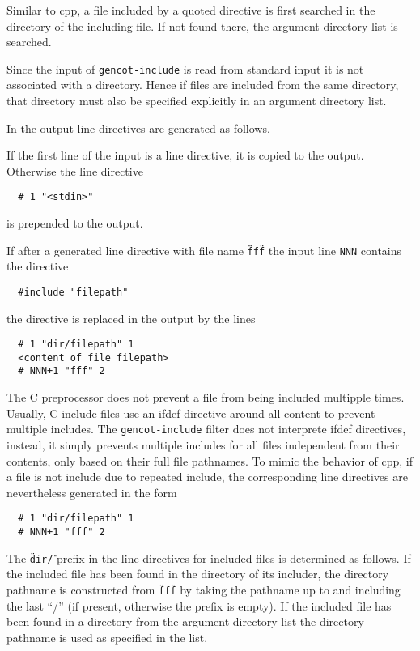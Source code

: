 \documentclass[a4paper]{report}
\newcommand{\code}[1]{\textnormal{\texttt{#1}}}
\begin{document}
Similar to cpp, a file included by a quoted directive is first searched in the directory of the including file. 
If not found there, the argument directory list is searched.

Since the input of \code{gencot-include} is read from standard input it is not associated with a directory. Hence
if files are included from the same directory, that directory must also be specified explicitly in an argument directory
list.

In the output line directives are generated as follows.

If the first line of the input is a line directive, it is copied to the output. Otherwise 
the line directive
\begin{verbatim}
  # 1 "<stdin>"
\end{verbatim}
is prepended to the output.

If after a generated line directive with file name \code{\"fff\"} the input line \code{NNN} contains the 
directive 
\begin{verbatim}
  #include "filepath"
\end{verbatim}
the directive is replaced in the output by the lines 
\begin{verbatim}
  # 1 "dir/filepath" 1
  <content of file filepath>
  # NNN+1 "fff" 2
\end{verbatim}

The C preprocessor does not prevent a file from being included multipple times. Usually, C include files use
an ifdef directive around all content to prevent multiple includes. The \code{gencot-include} filter does
not interprete ifdef directives, instead, it simply prevents multiple includes for all files independent 
from their contents, only based on their full file pathnames. To mimic the behavior of cpp, if a file is 
not include due to repeated include, the corresponding line directives are nevertheless generated in the form
\begin{verbatim}
  # 1 "dir/filepath" 1
  # NNN+1 "fff" 2
\end{verbatim}

The \code{\"dir/\"} prefix in the line directives for included files is determined as follows. 
If the included file has been found in the 
directory of its includer, the directory pathname is constructed from \code{\"fff\"} by taking the pathname 
up to and including the last ``/'' (if present, otherwise the prefix is empty).
If the included file has been found in a directory from the argument directory list
the directory pathname is used as specified in the list.
\end{document}
